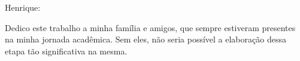 \begin{dedicatoria}
\vspace*{\fill}
Henrique:

Dedico este trabalho a minha família e amigos, que sempre estiveram presentes na minha jornada acadêmica. Sem eles, não seria possível a elaboração dessa etapa tão significativa na mesma. 
\vspace*{\fill}
\end{dedicatoria}